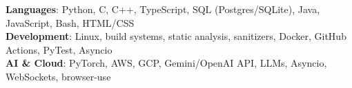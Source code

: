 \begin{itemize}[leftmargin=0.15in, label={}]
    \small{\item{
     \textbf{Languages}{: Python, C, C++, TypeScript, SQL (Postgres/SQLite), Java, JavaScript, Bash, HTML/CSS} \\
     \textbf{Development}{: Linux, build systems, static analysis, sanitizers, Docker, GitHub Actions, PyTest, Asyncio} \\
     \textbf{AI \& Cloud}{: PyTorch, AWS, GCP, Gemini/OpenAI API, LLMs, Asyncio, WebSockets, browser-use}
    }}
\end{itemize}

